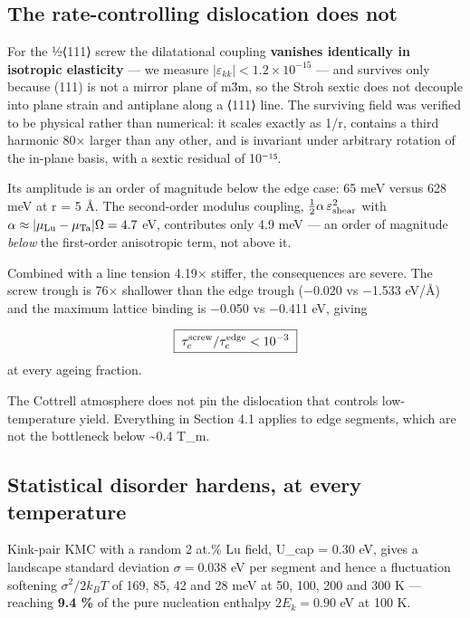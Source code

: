 \hypertarget{the-rate-controlling-dislocation-does-not}{%
\subsection{The rate-controlling dislocation does not}\label{sec:the-rate-controlling-dislocation-does-not}}

For the ½⟨111⟩ screw the dilatational coupling \textbf{vanishes identically in isotropic elasticity} --- we measure \(|\varepsilon_{kk}| < 1.2\times10^{-15}\) --- and survives only because (111) is not a mirror plane of m3̄m, so the Stroh sextic does not decouple into plane strain and antiplane along a ⟨111⟩ line. The surviving field was verified to be physical rather than numerical: it scales exactly as 1/r, contains a third harmonic 80× larger than any other, and is invariant under arbitrary rotation of the in-plane basis, with a sextic residual of 10⁻¹⁵.

Its amplitude is an order of magnitude below the edge case: 65 meV versus 628 meV at r = 5 Å. The second-order modulus coupling, \(\tfrac12\alpha\,\varepsilon_{\rm shear}^2\) with \(\alpha\approx|\mu_{\rm Lu}-\mu_{\rm Ta}|\Omega = 4.7\) eV, contributes only 4.9 meV --- an order of magnitude \emph{below} the first-order anisotropic term, not above it.

Combined with a line tension 4.19× stiffer, the consequences are severe. The screw trough is 76× shallower than the edge trough (−0.020 vs −1.533 eV/Å) and the maximum lattice binding is −0.050 vs −0.411 eV, giving

\[\boxed{\;\tau_c^{\rm screw}/\tau_c^{\rm edge} < 10^{-3}\;}\] at every ageing fraction.

The Cottrell atmosphere does not pin the dislocation that controls low-temperature yield. Everything in Section 4.1 applies to edge segments, which are not the bottleneck below \textasciitilde0.4 T\_m.

\hypertarget{statistical-disorder-hardens-at-every-temperature}{%
\subsection{Statistical disorder hardens, at every temperature}\label{sec:statistical-disorder-hardens-at-every-temperature}}

Kink-pair KMC with a random 2 at.\% Lu field, U\_cap = 0.30 eV, gives a landscape standard deviation \(\sigma = 0.038\) eV per segment and hence a fluctuation softening \(\sigma^2/2k_BT\) of 169, 85, 42 and 28 meV at 50, 100, 200 and 300 K --- reaching \textbf{9.4 \%} of the pure nucleation enthalpy \(2E_k = 0.90\) eV at 100 K.

